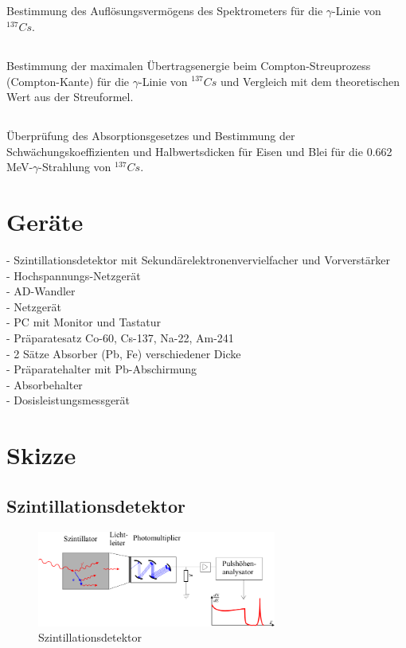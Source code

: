 \documentclass[11pt,a4paper]{article}
\begin{document}
\subsection{}
Bestimmung des Auflösungsvermögens des Spektrometers für die $\gamma$-Linie von $^{137}Cs$.
\subsection{}
Bestimmung der maximalen Übertragsenergie beim Compton-Streuprozess (Compton-Kante)
für die $\gamma$-Linie von $^{137}Cs$ und Vergleich mit dem theoretischen Wert aus der Streuformel.
\subsection{}
Überprüfung des Absorptionsgesetzes und Bestimmung der Schwächungskoeffizienten
und Halbwertsdicken für Eisen und Blei für die 0.662 MeV-$\gamma$-Strahlung von $^{137}Cs$.


\section{Geräte}
- Szintillationsdetektor mit Sekundärelektronenvervielfacher und Vorverstärker
\\- Hochspannungs-Netzgerät 
\\- AD-Wandler
\\- Netzgerät
\\- PC mit Monitor und Tastatur
\\- Präparatesatz Co-60, Cs-137, Na-22, Am-241
\\- 2 Sätze Absorber (Pb, Fe) verschiedener Dicke
\\- Präparatehalter mit Pb-Abschirmung
\\- Absorbehalter
\\- Dosisleistungsmessgerät

\section{Skizze}
\subsection{Szintillationsdetektor}
\begin{figure}[htbp] 
  \centering
\includegraphics[width=0.7\textwidth]{Szint.png}
  \caption{Szintillationsdetektor}
  \label{fig:Bild1}
\end{figure}
\end{document}
